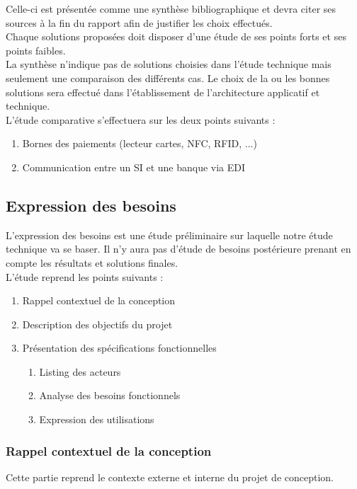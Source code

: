 Celle-ci est présentée comme une synthèse bibliographique et devra citer ses
sources à la fin du rapport afin de justifier les choix effectués. \\

Chaque solutions proposées doit disposer d'une étude de ses points forts et ses
points faibles. \\

La synthèse n'indique pas de solutions choisies dans l'étude technique mais
seulement une comparaison des différents cas. Le choix de la ou les bonnes
solutions sera effectué dans l'établissement de l'architecture applicatif et
technique. \\

L'étude comparative s'effectuera sur les deux points suivants :
\begin{enumerate}
  \item Bornes des paiements (lecteur cartes, NFC, RFID, ...)
  \item Communication entre un SI et une banque via EDI
\end{enumerate}

\subsection{Expression des besoins}
L'expression des besoins est une étude préliminaire sur laquelle notre étude
technique va se baser. Il n'y aura pas d'étude de besoins postérieure prenant en
compte les résultats et solutions finales. \\

L'étude reprend les points suivants :
\begin{enumerate}
  \item Rappel contextuel de la conception
  \item Description des objectifs du projet
  \item Présentation des spécifications fonctionnelles
    \begin{enumerate}
      \item Listing des acteurs
      \item Analyse des besoins fonctionnels
      \item Expression des utilisations
    \end{enumerate}
\end{enumerate}

\subsubsection{Rappel contextuel de la conception}
Cette partie reprend le contexte externe et interne du projet de conception. \\

